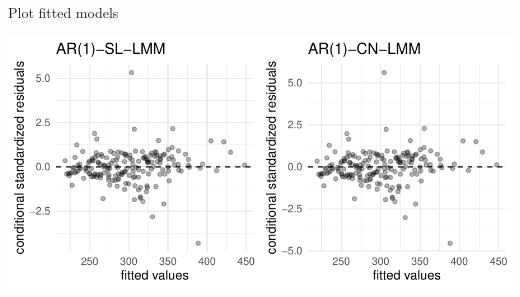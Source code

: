 \begin{frame}[fragile]{Plot fitted models}
\protect\hypertarget{plot-fitted-models}{}

\scriptsize

\begin{Shaded}
\begin{Highlighting}[]
\NormalTok{(} \NormalTok{)}\OperatorTok{+}\NormalTok{(}\NormalTok{),}
              \NormalTok{)}\OperatorTok{+}\NormalTok{(}\NormalTok{),}
             \NormalTok{)}
\end{Highlighting}
\end{Shaded}

\begin{center}\includegraphics[width=0.85\linewidth]{codes_files/figure-beamer/extra1-1} \end{center}

\end{frame}

